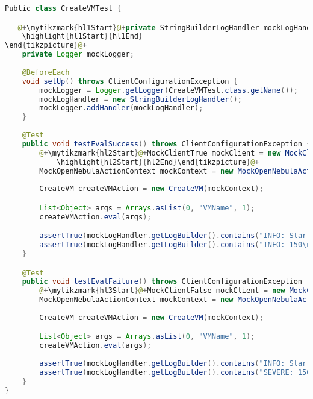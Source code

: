 \begin{lstlisting}[language=Java, caption=CreateVMTest, label=code:CreateVMTest, basicstyle=\fontsize{9}{10}\ttfamily]
Public class CreateVMTest {

   @+\mytikzmark{hl1Start}@+private StringBuilderLogHandler mockLogHandler;@+\mytikzmark{hl1End}@+@+\begin{tikzpicture}[remember picture, overlay]
    \highlight{hl1Start}{hl1End}
\end{tikzpicture}@+
	private Logger mockLogger;
	
	@BeforeEach
	void setUp() throws ClientConfigurationException {
		mockLogger = Logger.getLogger(CreateVMTest.class.getName());
		mockLogHandler = new StringBuilderLogHandler();
		mockLogger.addHandler(mockLogHandler);
	}
	
    @Test
    public void testEvalSuccess() throws ClientConfigurationException {
    	@+\mytikzmark{hl2Start}@+MockClientTrue mockClient = new MockClientTrue("150");@+\mytikzmark{hl2End}@+@+\begin{tikzpicture}[remember picture, overlay]
            \highlight{hl2Start}{hl2End}\end{tikzpicture}@+
    	MockOpenNebulaActionContext mockContext = new MockOpenNebulaActionContext(mockClient, mockLogger);
    	
        CreateVM createVMAction = new CreateVM(mockContext);

        List<Object> args = Arrays.asList(0, "VMName", 1);
        createVMAction.eval(args);

        assertTrue(mockLogHandler.getLogBuilder().contains("INFO: Starting VM: [1, VMName]\n"));
        assertTrue(mockLogHandler.getLogBuilder().contains("INFO: 150\n"));
    }

    @Test
    public void testEvalFailure() throws ClientConfigurationException {
    	@+\mytikzmark{hl3Start}@+MockClientFalse mockClient = new MockClientFalse("150");@+\mytikzmark{hl3End}@+
    	MockOpenNebulaActionContext mockContext = new MockOpenNebulaActionContext(mockClient, mockLogger);
    	
        CreateVM createVMAction = new CreateVM(mockContext);

        List<Object> args = Arrays.asList(0, "VMName", 1);
        createVMAction.eval(args);
        
        assertTrue(mockLogHandler.getLogBuilder().contains("INFO: Starting VM: [1, VMName]\n"));
        assertTrue(mockLogHandler.getLogBuilder().contains("SEVERE: 150\n"));
    }
}
\end{lstlisting}
